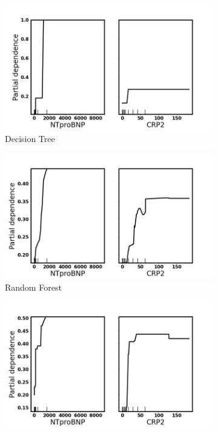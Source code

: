\begin{figure}
\centering
\begin{subfigure}[b]{0.475\textwidth}
    \centering
    \includegraphics[width=\textwidth]{figures/chapter_interp/dt_pdp_crp_ntproBNP.png}
    \caption{Decision Tree}
    \label{fig:dt_pdp}
\end{subfigure}
\begin{subfigure}[b]{0.475\textwidth}
    \centering
    \includegraphics[width=\textwidth]{figures/chapter_interp/rf_pdp_crp_ntproBNP.png}
    \caption{Random Forest}
    \label{fig:rf_pdp}
\end{subfigure}
\begin{subfigure}[b]{0.475\textwidth}
    \centering
    \includegraphics[width=\textwidth]{figures/chapter_interp/xgbc_pdp_crp_ntproBNP.png}

\end{subfigure}
\end{figure}
